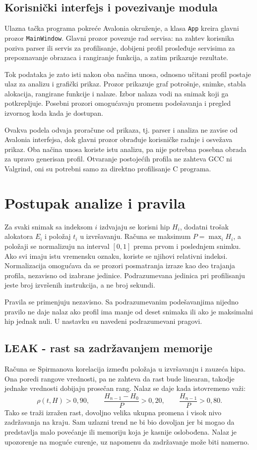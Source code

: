 \documentclass[a4paper,10pt]{article}
\begin{document}
\subsection{Korisnički interfejs i povezivanje modula}

Ulazna tačka programa pokreće Avalonia okruženje, a klasa \texttt{App} kreira
glavni prozor \texttt{MainWindow}. Glavni prozor povezuje rad servisa:
na zahtev korisnika poziva parser ili servis za profilisanje, dobijeni profil
prosleđuje servisima za prepoznavanje obrazaca i rangiranje funkcija, a zatim
prikazuje rezultate.

Tok podataka je zato isti nakon oba načina unosa, odnosno učitani profil postaje ulaz
za analizu i grafički prikaz. Prozor prikazuje graf potrošnje, snimke,
stabla alokacija, rangirane funkcije i nalaze. Izbor nalaza vodi na snimak koji
ga potkrepljuje. Posebni prozori omogućavaju promenu podešavanja i pregled
izvornog koda kada je dostupan.

Ovakva podela odvaja proračune od prikaza, tj. parser i analiza ne zavise od
Avalonia interfejsa, dok glavni prozor obrađuje korisničke radnje i osvežava
prikaz. Oba načina unosa koriste istu analizu, pa nije potrebna posebna obrada
za upravo generisan profil. Otvaranje postojećih profila ne zahteva GCC ni
Valgrind, oni su potrebni samo za direktno profilisanje C programa.

\section{Postupak analize i pravila}

Za svaki snimak sa indeksom $i$ izdvajaju se korisni hip $H_i$, dodatni trošak
alokatora $E_i$ i položaj $t_i$ u izvršavanju. Računa se maksimum
$P=\max_i H_i$, a položaji se normalizuju na interval $[0,1]$ prema prvom i
poslednjem snimku. Ako svi imaju istu vremensku oznaku, koriste se njihovi
relativni indeksi. Normalizacija omogućava da se prozori posmatranja izraze kao
deo trajanja profila, nezavisno od izabrane jedinice. Podrazumevana jedinica pri
profilisanju jeste broj izvršenih instrukcija, a ne broj sekundi.

Pravila se primenjuju nezavisno. Sa podrazumevanim podešavanjima nijedno pravilo ne daje
nalaz ako profil ima manje od deset snimaka ili ako je maksimalni hip jednak nuli.
U nastavku su navedeni podrazumevani pragovi.

\subsection{LEAK - rast sa zadržavanjem memorije}
Računa se Spirmanova korelacija između položaja u izvršavanju i zauzeća hipa.
Ona poredi rangove vrednosti, pa ne zahteva da rast bude linearan, takodje jednake
vrednosti dobijaju prosečan rang. Nalaz se daje kada istovremeno važi:
\[
  \rho(t,H)>0{,}90, \qquad
  \frac{H_{n-1}-H_0}{P}>0{,}20, \qquad
  \frac{H_{n-1}}{P}>0{,}80.
\]
Tako se traži izražen rast, dovoljno velika ukupna promena i visok nivo
zadržavanja na kraju. Sam uzlazni trend ne bi bio dovoljan jer bi mogao da predstavlja
malo povećanje ili memoriju koja je kasnije oslobođena. Nalaz je upozorenje na
moguće curenje, uz napomenu da zadržavanje može biti namerno.
\end{document}
